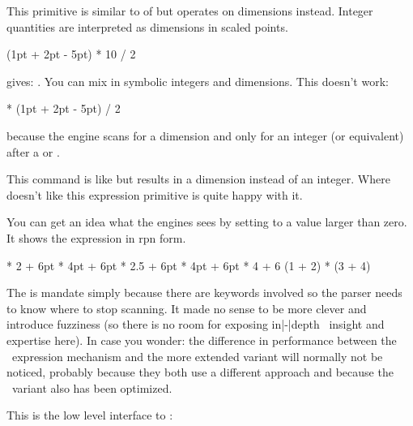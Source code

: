 
\startoldprimitive[title={\prm {dimexpr}}]

This primitive is similar to of  but operates on dimensions
instead. Integer quantities are interpreted as dimensions in scaled points.

\startbuffer
\the\dimexpr (1pt + 2pt - 5pt) * 10 / 2 \relax
\stopbuffer

\typebuffer

gives: \inlinebuffer. You can mix in symbolic integers and dimensions. This doesn't work:

\startbuffer
\the{} * (1pt + 2pt - 5pt) / 2 \relax
\stopbuffer

because the engine scans for a dimension and only for an integer (or equivalent)
after a \type {*} or \type {/}.


\stopoldprimitive

\startnewprimitive[title={\prm {dimexpression}}]

This command is like  but results in a dimension instead of
an integer. Where  doesn't like  this expression
primitive is quite happy with it.

You can get an idea what the engines sees by setting 
to a value larger than zero. It shows the expression in rpn form.

\starttyping
\dimexpression 4pt * 2   + 6pt   \relax
{}   * 4pt + 6pt   \relax
\dimexpression 4pt * 2.5 + 6pt   \relax
{} * 4pt + 6pt   \relax
{} * 4 + 6         \relax
\numexpression (1 + 2) * (3 + 4) \relax
\stoptyping

The  is mandate simply because there are keywords involved so the
parser needs to know where to stop scanning. It made no sense to be more clever
and introduce fuzziness (so there is no room for exposing in|-|depth \TEX\
insight and expertise here). In case you wonder: the difference in performance
between the \ETEX\ expression mechanism and the more extended variant will
normally not be noticed, probably because they both use a different approach and
because the \ETEX\ variant also has been optimized.

\stopnewprimitive

\startnewprimitive[title={\prm {directlua}}]

This is the low level interface to \LUA:


